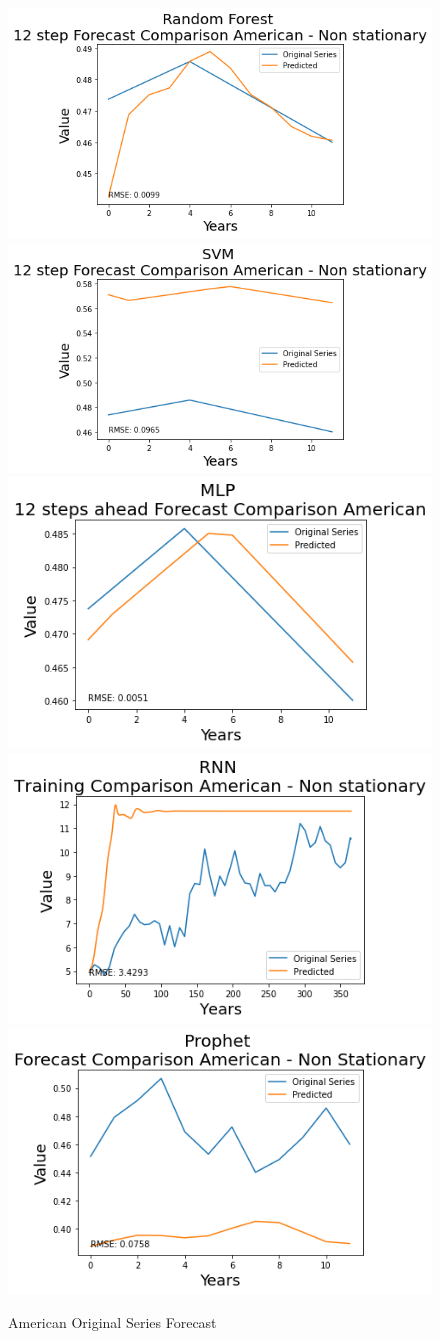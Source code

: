 \documentclass[10pt,twocolumn,letterpaper]{article}
\begin{document}
	\begin{figure}[h]
		\centering
		\includegraphics[width=0.45\linewidth]{../img/RandomForest/american_for}
		\includegraphics[width=0.45\linewidth]{../img/SVM/american_for}
		\includegraphics[width=0.45\linewidth]{../img/MLP/american_for}
		\includegraphics[width=0.45\linewidth]{../img/RNN/american_for}
		\includegraphics[width=0.45\linewidth]{../img/Prophet/american_for}
		\caption{American Original Series Forecast}
		\label{fig:americanforecast}
	\end{figure}
	
\end{document}
